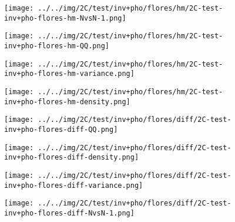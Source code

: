 \begin{figure}[H]
\centering	\texttt{[image: ../../img/2C/test/inv+pho/flores/hm/2C-test-inv+pho-flores-hm-NvsN-1.png]}
\end{figure}
\begin{figure}[H]
\centering	\texttt{[image: ../../img/2C/test/inv+pho/flores/hm/2C-test-inv+pho-flores-hm-QQ.png]}
\end{figure}
\begin{figure}[H]
\centering	\texttt{[image: ../../img/2C/test/inv+pho/flores/hm/2C-test-inv+pho-flores-hm-variance.png]}
\end{figure}
\begin{figure}[H]
\centering	\texttt{[image: ../../img/2C/test/inv+pho/flores/hm/2C-test-inv+pho-flores-hm-density.png]}
\end{figure}
\begin{figure}[H]
\centering	\texttt{[image: ../../img/2C/test/inv+pho/flores/diff/2C-test-inv+pho-flores-diff-QQ.png]}
\end{figure}
\begin{figure}[H]
\centering	\texttt{[image: ../../img/2C/test/inv+pho/flores/diff/2C-test-inv+pho-flores-diff-density.png]}
\end{figure}
\begin{figure}[H]
\centering	\texttt{[image: ../../img/2C/test/inv+pho/flores/diff/2C-test-inv+pho-flores-diff-variance.png]}
\end{figure}
\begin{figure}[H]
\centering	\texttt{[image: ../../img/2C/test/inv+pho/flores/diff/2C-test-inv+pho-flores-diff-NvsN-1.png]}
\end{figure}
